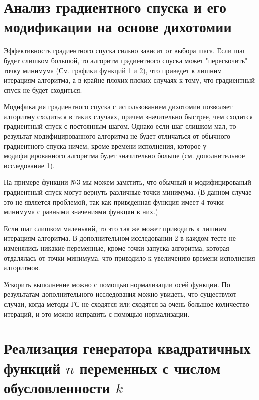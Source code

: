\section{Анализ градиентного спуска и его модификации на основе дихотомии}

Эффективность градиентного спуска сильно зависит от выбора шага. Если шаг будет слишком большой, то алгоритм градиентного спуска может "перескочить" точку минимума (См. графики функций 1 и 2), что приведет к лишним итерациям алгоритма, а в крайне плохих плохих случаях к тому, что градиентный спуск не будет сходиться.

Модификация градиентного спуска с использованием дихотомии позволяет алгоритму сходиться в таких случаях, причем значительно быстрее, чем сходится градиентный спуск с постоянным шагом. Однако если шаг слишком мал, то результат модифицированного алгоритма не будет отличаться от обычного градиентного спуска ничем, кроме времени исполнения, которое у модифицированного алгоритма будет значительно больше (см. дополнительное исследование 1).

На примере функции №3 мы можем заметить, что обычный и модифицированый градиентный спуск могут вернуть различные точки минимума. (В данном случае это не является проблемой, так как приведенная функция имеет 4 точки минимума с равными значениями функции в них.)

Если шаг слишком маленький, то это так же может приводить к лишним итерациям алгоритма. В дополнительном исследовании 2 в каждом тесте не изменялись никакие переменные, кроме точки запуска алгоритма, которая отдалялась от точки минимума, что приводило к увеличению времени исполнения алгоритмов. 

Ускорить выполнение можно с помощью нормализации осей функции. По результатам дополнительного исследования можно увидеть, что существуют случаи, когда методы ГС не сходятся или сходятся за очень большое количество итераций, и это можно исправить с помощью нормализации.

\section{Реализация генератора квадратичных функций $n$ переменных с числом обусловленности $k$}

